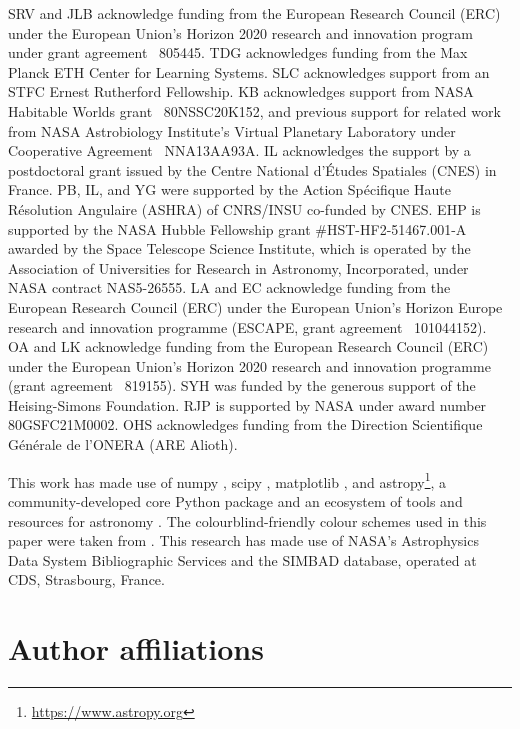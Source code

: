 \documentclass[usenatbib]{mnras}
\begin{document}
SRV and JLB acknowledge funding from the European Research Council (ERC) under the European Union's Horizon 2020 research and innovation program under grant agreement \textnumero~805445.
%
TDG acknowledges funding from the Max Planck ETH Center for Learning Systems.
%
SLC acknowledges support from an STFC Ernest Rutherford Fellowship. 
%
KB acknowledges support from NASA Habitable Worlds grant \textnumero~80NSSC20K152, and previous support for related work from NASA Astrobiology Institute's Virtual Planetary Laboratory under Cooperative Agreement \textnumero~NNA13AA93A.
%
IL acknowledges the support by a postdoctoral grant issued by the Centre National d'Études Spatiales (CNES) in France.
%
PB, IL, and YG were supported by the Action Spécifique Haute Résolution Angulaire (ASHRA) of CNRS/INSU co-funded by CNES.
%
EHP is supported by the NASA Hubble Fellowship grant \#HST-HF2-51467.001-A awarded by the Space Telescope Science Institute, which is operated by the Association of Universities for Research in Astronomy, Incorporated, under NASA contract NAS5-26555.
%
LA and EC acknowledge funding from the European Research Council (ERC) under the European Union's Horizon Europe research and innovation programme (ESCAPE, grant agreement \textnumero~101044152).
%
OA and LK acknowledge funding from the European Research Council (ERC) under the European Union's Horizon 2020 research and innovation programme (grant agreement \textnumero~819155).
%
SYH was funded by the generous support of the Heising-Simons Foundation.
%
RJP is supported by NASA under award number 80GSFC21M0002.
%
OHS acknowledges funding from the Direction Scientifique Générale de l'ONERA (ARE Alioth).

This work has made use of \textsf{numpy} \citep{NumPy2020}, \textsf{scipy} \citep{scipy_2020}, \textsf{matplotlib} \citep{matplotlib2007}, and \textsf{astropy}\footnote{\url{https://www.astropy.org}}, a community-developed core Python package and an ecosystem of tools and resources for astronomy \citep{astropy:2013, astropy:2018, astropy:2022}.
The colourblind-friendly colour schemes used in this paper were taken from \citet{Petroff_2021}.
This research has made use of NASA's Astrophysics Data System Bibliographic Services and the SIMBAD database, operated at CDS, Strasbourg, France. 




\section*{Author affiliations}
\begingroup
    \itshape
    \raggedright
    
\endgroup
\end{document}
